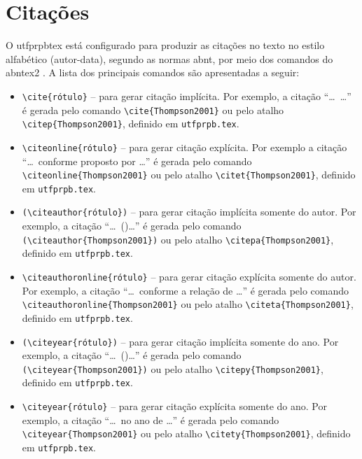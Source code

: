 \section{Citações}\label{sec:citacoes}

O \gls{utfprpbtex} está configurado para produzir as citações no texto no estilo alfabético (autor-data), segundo as normas \gls{abnt}, por meio dos comandos do \gls{abntex2} \cite{abnTeX2:2013Cite,abnTeX2:2013CiteAlf}. A lista dos principais comandos são apresentadas a seguir:

\begin{itemize}%
\item \verb|\cite{rótulo}| -- para gerar citação implícita. Por exemplo, a citação ``\ldots\ \cite{Thompson2001}\ldots'' é gerada pelo comando \verb|\cite{Thompson2001}| ou pelo atalho \verb|\citep{Thompson2001}|, definido em \texttt{utfprpb.tex}.
\item \verb|\citeonline{rótulo}| -- para gerar citação explícita. Por exemplo a citação ``\ldots\ conforme proposto por \ldots'' é gerada pelo comando \verb|\citeonline{Thompson2001}| ou pelo atalho \verb|\citet{Thompson2001}|, definido em \texttt{utfprpb.tex}.
\item \verb|(\citeauthor{rótulo})| -- para gerar citação implícita somente do autor. Por exemplo, a citação ``\ldots\ (\citeauthor{Thompson2001})\ldots'' é gerada pelo comando \verb|(\citeauthor{Thompson2001})| ou pelo atalho \verb|\citepa{Thompson2001}|, definido em \texttt{utfprpb.tex}.
\item \verb|\citeauthoronline{rótulo}| -- para gerar citação explícita somente do autor. Por exemplo, a citação ``\ldots\ conforme a relação de \ldots'' é gerada pelo comando \verb|\citeauthoronline{Thompson2001}| ou pelo atalho \verb|\citeta{Thompson2001}|, definido em \texttt{utfprpb.tex}.
\item \verb|(\citeyear{rótulo})| -- para gerar citação implícita somente do ano. Por exemplo, a citação ``\ldots\ (\citeyear{Thompson2001})\ldots'' é gerada pelo comando \verb|(\citeyear{Thompson2001})| ou pelo atalho \verb|\citepy{Thompson2001}|, definido em \texttt{utfprpb.tex}.
\item \verb|\citeyear{rótulo}| -- para gerar citação explícita somente do ano. Por exemplo, a citação ``\ldots\ no ano de \citeyear{Thompson2001}\ldots'' é gerada pelo comando \verb|\citeyear{Thompson2001}| ou pelo atalho \verb|\citety{Thompson2001}|, definido em \texttt{utfprpb.tex}.
\end{itemize}


